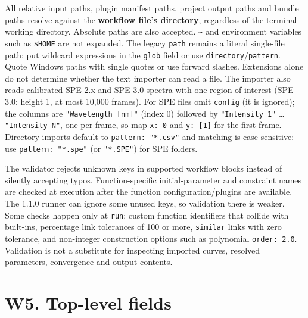 \documentclass[
  10pt,
  a4paper,
  oneside]{scrreprt}
\begin{document}
All relative input paths, plugin manifest paths, project output paths
and bundle paths resolve against the \textbf{workflow file's directory},
regardless of the terminal working directory. Absolute paths are also
accepted. \texttt{\textasciitilde{}} and environment variables such as
\texttt{\$HOME} are not expanded. The legacy \texttt{path} remains a
literal single-file path: put wildcard expressions in the \texttt{glob}
field or use \texttt{directory}/\texttt{pattern}. Quote Windows paths
with single quotes or use forward slashes. Extensions alone do not
determine whether the text importer can read a file. The importer also
reads calibrated SPE 2.x and SPE 3.0 spectra with one region of interest
(SPE 3.0: height 1, at most 10,000 frames). For SPE files omit
\texttt{config} (it is ignored); the columns are
\texttt{"Wavelength\ {[}nm{]}"} (index 0) followed by
\texttt{"Intensity\ 1"} \ldots{} \texttt{"Intensity\ N"}, one per frame,
so map \texttt{x:\ 0} and \texttt{y:\ {[}1{]}} for the first frame.
Directory imports default to \texttt{pattern:\ "*.csv"} and matching is
case-sensitive: use \texttt{pattern:\ "*.spe"} (or \texttt{"*.SPE"}) for
SPE folders.

The validator rejects unknown keys in supported workflow blocks instead
of silently accepting typos. Function-specific initial-parameter and
constraint names are checked at execution after the function
configuration/plugins are available. The 1.1.0 runner can ignore some
unused keys, so validation there is weaker. Some checks happen only at
\texttt{run}: custom function identifiers that collide with built-ins,
percentage link tolerances of 100 or more, \texttt{similar} links with
zero tolerance, and non-integer construction options such as polynomial
\texttt{order:\ 2.0}. Validation is not a substitute for inspecting
imported curves, resolved parameters, convergence and output contents.

\hypertarget{w5.-top-level-fields}{%
\section{W5. Top-level fields}\label{w5.-top-level-fields}}
\end{document}
